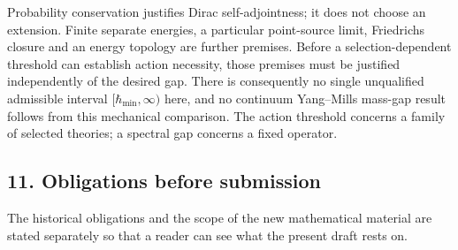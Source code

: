 \documentclass[11pt,a4paper]{article}
\begin{document}
Probability conservation justifies Dirac self-adjointness; it does not
choose an extension. Finite separate energies, a particular point-source
limit, Friedrichs closure and an energy topology are further premises.
Before a selection-dependent threshold can establish action necessity,
those premises must be justified independently of the desired gap. There
is consequently no single unqualified admissible interval
\([\hbar_{\min},\infty)\) here, and no continuum Yang--Mills mass-gap
result follows from this mechanical comparison. The action threshold
concerns a family of selected theories; a spectral gap concerns a fixed
operator.

\hypertarget{obligations-before-submission}{%
\subsection{11. Obligations before
submission}\label{obligations-before-submission}}

The historical obligations and the scope of the new mathematical
material are stated separately so that a reader can see what the present
draft rests on.
\end{document}
